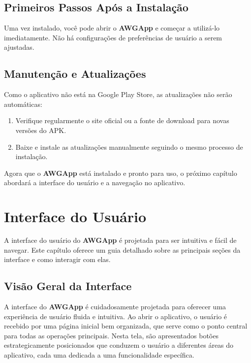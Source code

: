 \documentclass[12pt,a4paper]{book}
\newcommand{\nomesoftware}{AWGApp}
\begin{document}
\section{Primeiros Passos Após a Instalação}

Uma vez instalado, você pode abrir o \textbf{\nomesoftware{}} e começar a utilizá-lo imediatamente. Não há configurações de preferências de usuário a serem ajustadas.

\section{Manutenção e Atualizações}

Como o aplicativo não está na Google Play Store, as atualizações não serão automáticas:

\begin{enumerate}
    \item Verifique regularmente o site oficial ou a fonte de download para novas versões do APK.
    \item Baixe e instale as atualizações manualmente seguindo o mesmo processo de instalação.
\end{enumerate}

Agora que o \textbf{\nomesoftware{}} está instalado e pronto para uso, o próximo capítulo abordará a interface do usuário e a navegação no aplicativo.

\chapter{Interface do Usuário}

A interface do usuário do \textbf{\nomesoftware{}} é projetada para ser intuitiva e fácil de navegar. Este capítulo oferece um guia detalhado sobre as principais seções da interface e como interagir com elas.

\section{Visão Geral da Interface}

A interface do \textbf{\nomesoftware} é cuidadosamente projetada para oferecer uma experiência de usuário fluida e intuitiva. Ao abrir o aplicativo, o usuário é recebido por uma página inicial bem organizada, que serve como o ponto central para todas as operações principais. Nesta tela, são apresentados botões estrategicamente posicionados que conduzem o usuário a diferentes áreas do aplicativo, cada uma dedicada a uma funcionalidade específica.
\end{document}
